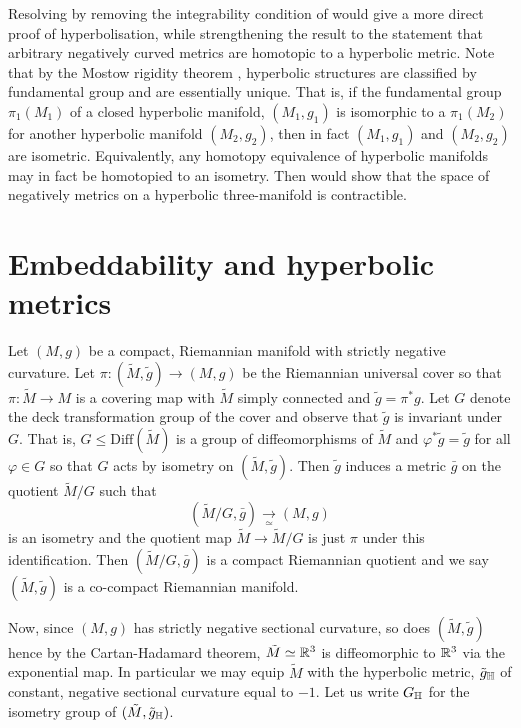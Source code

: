 \documentclass[a4paper,12pt]{amsart}
\begin{document}
Resolving  by removing the integrability condition of  would give a more direct proof of hyperbolisation, while strengthening the result to the statement that arbitrary negatively curved metrics are homotopic to a hyperbolic metric. Note that by the Mostow rigidity theorem \cite{MR0236383}, hyperbolic structures are classified by fundamental group and are essentially unique. That is, if the fundamental group \(\pi_1(M_1)\) of a closed hyperbolic manifold, \((M_1, g_1)\) is isomorphic to a \(\pi_1(M_2)\) for another hyperbolic manifold \((M_2, g_2)\), then in fact \((M_1, g_1)\) and \((M_2, g_2)\) are isometric. Equivalently, any homotopy equivalence of hyperbolic manifolds may in fact be homotopied to an isometry. Then  would show that the space of negatively metrics on a hyperbolic three-manifold is contractible.

\section{Embeddability and hyperbolic metrics}
\label{sec:embed_intg}

Let \((M, g)\) be a compact, Riemannian manifold with strictly negative curvature. Let \(\pi\colon (\tilde{M}, \tilde{g}) \to (M, g)\) be the Riemannian universal cover so that \(\pi : \tilde{M} \to M\) is a covering map with \(\tilde{M}\) simply connected and \(\tilde{g} = \pi^{\ast} g\). Let \(G\) denote the deck transformation group of the cover and observe that \(\tilde{g}\) is invariant under \(G\). That is, \(G \leq \text{Diff}(\tilde{M})\) is a group of diffeomorphisms of \(\tilde{M}\) and \(\varphi^{\ast} \tilde{g} = \tilde{g}\) for all \(\varphi \in G\) so that \(G\) acts by isometry on \((\tilde{M}, \tilde{g})\). Then \(\tilde{g}\) induces a metric \(\bar{g}\) on the quotient \(\tilde{M}/G\) such that
\[
(\tilde{M}/G, \bar{g}) \underset{\simeq}{\to} (M, g)
\]
is an isometry and the quotient map \(\tilde{M} \to \tilde{M}/G\) is just \(\pi\) under this identification. Then \((\tilde{M}/G, \bar{g})\) is a compact Riemannian quotient and we say \((\tilde{M}, \tilde{g})\) is a co-compact Riemannian manifold.

Now, since \((M, g)\) has strictly negative sectional curvature, so does \((\tilde{M}, \tilde{g})\) hence by the Cartan-Hadamard theorem, \(\tilde{M} \simeq \mathbb{R}^3\) is diffeomorphic to \(\mathbb{R}^3\) via the exponential map. In particular we may equip \(\tilde{M}\) with the hyperbolic metric, \(\tilde{g}_{\mathbb{H}}\) of constant, negative sectional curvature equal to \(-1\). Let us write \(G_{\mathbb{H}}\) for the isometry group of \((\tilde{M}, \tilde{g}_{\mathbb{H}})\).
\end{document}
